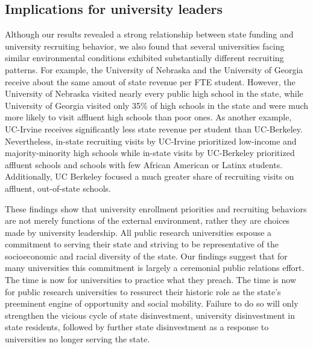 \documentclass[twoside]{article}
\begin{document}

\subsection*{Implications for university leaders}

Although our results revealed a strong relationship between state funding and university recruiting behavior, we also found that several universities facing similar environmental conditions exhibited substantially different recruiting patterns. For example, the University of Nebraska and the University of Georgia receive about the same amout of state revenue per FTE student. However, the University of Nebraska visited nearly every public high school in the state, while University of Georgia visited only 35\% of high schools in the state and were much more likely to visit affluent high schools than poor ones. As another example, UC-Irvine receives significantly less state revenue per student than UC-Berkeley. Nevertheless, in-state recruiting visits by UC-Irvine prioritized low-income and majority-minority high schools while in-state visits by UC-Berkeley prioritized affluent schools and schools with few African American or Latinx students. Additionally, UC Berkeley focused a much greater share of recruiting visits on affluent, out-of-state schools.

These findings show that university enrollment priorities and recruiting behaviors are not merely functions of the external environment, rather they are choices made by university leadership.  All public research universities espouse a commitment to serving their state and striving to be representative of the socioeconomic and racial diversity of the state. Our findings suggest that for many universities this commitment is largely a ceremonial public relations effort.  The time is now for universities to practice what they preach.  The time is now for public research universities to ressurect their historic role as the state's preeminent engine of opportunity and social mobility.  Failure to do so will only strengthen the vicious cycle of state disinvestment, university disinvestment in state residents, followed by further state disinvestment as a response to universities no longer serving the state.
\end{document}
